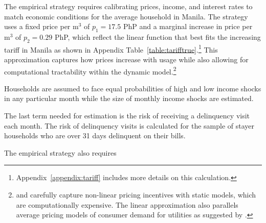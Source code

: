 \documentclass[12pt]{article}
\begin{document}
The empirical strategy requires calibrating prices, income, and interest rates to match economic conditions for the average household in Manila.  The strategy uses a fixed price per $\text{m}^{3}$ of $p_1=17.5$ PhP and a marginal increase in price per $\text{m}^{3}$ of $p_2=0.29$ PhP, which reflect the linear function that best fits the increasing tariff in Manila as shown in Appendix Table~\ref{table:tarifftrue}.\footnote{Appendix~\ref{appendix:tariff} includes more details on this calculation. }  This approximation captures how prices increase with usage while also allowing for computational tractability within the dynamic model.\footnote{\cite{wjv} and \cite{szabo2015value} carefully capture non-linear pricing incentives with static models, which are computationally expensive.  The linear approximation also parallels average pricing models of consumer demand for utilities as suggested by \cite{ito2014consumers}.}  







Households are assumed to face equal probabilities of high and low income shocks in any particular month while the size of monthly income shocks are estimated.  


The last term needed for estimation is the risk of receiving a delinquency visit each month.  The risk of delinquency visits is calculated for the sample of stayer households who are over 31 days delinquent on their bills. 



The empirical strategy also requires 
\end{document}
